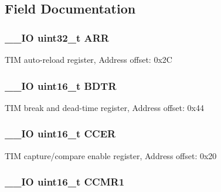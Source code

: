 \subsection{Field Documentation}
\hypertarget{struct_t_i_m___type_def_af17f19bb4aeea3cc14fa73dfa7772cb8}{
\subsubsection[{A\-R\-R}]{\setlength{\rightskip}{0pt plus 5cm}\-\_\-\-\_\-\-I\-O uint32\-\_\-t A\-R\-R}}\label{struct_t_i_m___type_def_af17f19bb4aeea3cc14fa73dfa7772cb8}
T\-I\-M auto-\/reload register, Address offset\-: 0x2\-C \hypertarget{struct_t_i_m___type_def_a112c0403ac38905a70cf5aaa9c8cc38a}{
\subsubsection[{B\-D\-T\-R}]{\setlength{\rightskip}{0pt plus 5cm}\-\_\-\-\_\-\-I\-O uint16\-\_\-t B\-D\-T\-R}}\label{struct_t_i_m___type_def_a112c0403ac38905a70cf5aaa9c8cc38a}
T\-I\-M break and dead-\/time register, Address offset\-: 0x44 \hypertarget{struct_t_i_m___type_def_ab1da3e84848ed66e0577c87c199bfb6d}{
\subsubsection[{C\-C\-E\-R}]{\setlength{\rightskip}{0pt plus 5cm}\-\_\-\-\_\-\-I\-O uint16\-\_\-t C\-C\-E\-R}}\label{struct_t_i_m___type_def_ab1da3e84848ed66e0577c87c199bfb6d}
T\-I\-M capture/compare enable register, Address offset\-: 0x20 \hypertarget{struct_t_i_m___type_def_a90d89aec51d8012b8a565ef48333b24b}{
\subsubsection[{C\-C\-M\-R1}]{\setlength{\rightskip}{0pt plus 5cm}\-\_\-\-\_\-\-I\-O uint16\-\_\-t C\-C\-M\-R1}}\label{struct_t_i_m___type_def_a90d89aec51d8012b8a565ef48333b24b}
